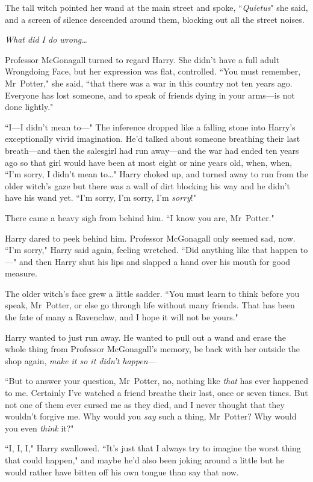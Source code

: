 The tall witch pointed her wand at the main street and spoke, ``\emph{Quietus}" she said, and a screen of silence descended around them, blocking out all the street noises.

\emph{What did I do wrong{\ldots}}

Professor McGonagall turned to regard Harry. She didn't have a full adult Wrongdoing Face, but her expression was flat, controlled. ``You must remember, Mr~Potter," she said, ``that there was a war in this country not ten years ago. Everyone has lost someone, and to speak of friends dying in your arms—is not done lightly."

``I—I didn't mean to—" The inference dropped like a falling stone into Harry's exceptionally vivid imagination. He'd talked about someone breathing their last breath—and then the salesgirl had run away—and the war had ended ten years ago so that girl would have been at most eight or nine years old, when, when, ``I'm sorry, I didn't mean to{\ldots}" Harry choked up, and turned away to run from the older witch's gaze but there was a wall of dirt blocking his way and he didn't have his wand yet. ``I'm sorry, I'm sorry, I'm \emph{sorry}!"

There came a heavy sigh from behind him. ``I know you are, Mr~Potter."

Harry dared to peek behind him. Professor McGonagall only seemed sad, now. ``I'm sorry," Harry said again, feeling wretched. ``Did anything like that happen to—" and then Harry shut his lips and slapped a hand over his mouth for good measure.

The older witch's face grew a little sadder. ``You must learn to think before you speak, Mr~Potter, or else go through life without many friends. That has been the fate of many a Ravenclaw, and I hope it will not be yours."

Harry wanted to just run away. He wanted to pull out a wand and erase the whole thing from Professor McGonagall's memory, be back with her outside the shop again, \emph{make it so it didn't happen—}

``But to answer your question, Mr~Potter, no, nothing like \emph{that} has ever happened to me. Certainly I've watched a friend breathe their last, once or seven times. But not one of them ever cursed me as they died, and I never thought that they wouldn't forgive me. Why would you \emph{say} such a thing, Mr~Potter? Why would you even \emph{think} it?"

``I, I, I," Harry swallowed. ``It's just that I always try to imagine the worst thing that could happen," and maybe he'd also been joking around a little but he would rather have bitten off his own tongue than say that now.

